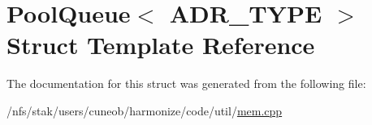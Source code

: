 \hypertarget{structPoolQueue}{\section{Pool\-Queue$<$ A\-D\-R\-\_\-\-T\-Y\-P\-E $>$ Struct Template Reference}
\label{structPoolQueue}
}


The documentation for this struct was generated from the following file\-:\begin{DoxyCompactItemize}
\item 
/nfs/stak/users/cuneob/harmonize/code/util/\hyperlink{mem_8cpp}{mem.\-cpp}\end{DoxyCompactItemize}
